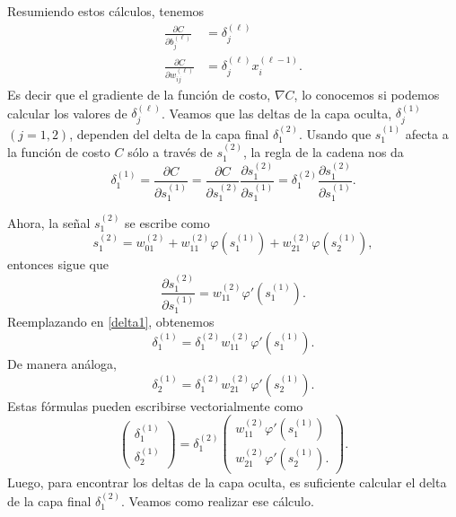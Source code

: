 \documentclass[12pt, a4paper]{amsbook}
\theoremstyle{remark}
\theoremstyle{definition}
\numberwithin{section}{chapter}
\numberwithin{subsection}{section}
\numberwithin{equation}{section}
\numberwithin{figure}{chapter}
\begin{document}
Resumiendo estos cálculos, tenemos
\begin{align}
\frac{\partial C}{\partial b_j^{(\ell)}} &= \delta_j^{(\ell)}\\
\frac{\partial C}{\partial w_{ij}^{(\ell)}} &= \delta_j^{(\ell)} x_i^{(\ell-1)}.
\end{align}
Es decir que el gradiente de la función de costo, $\nabla C$, lo conocemos si podemos calcular los valores de $\delta_j^{(\ell)}$. Veamos que las deltas de la capa oculta, $\delta_j^{(1)}$ $(j=1,2)$, dependen del delta de la capa final $\delta_1^{(2)}$. Usando que $s_1^{(1)}$ afecta a la función de costo $C$ sólo a través de $s_1^{(2)}$, la regla de la cadena nos da
\begin{equation}\label{delta1}
\delta_1^{(1)} = \frac{\partial C}{\partial s_1^{(1)}} =  \frac{\partial C}{\partial s_1^{(2)}} \frac{\partial s_1^{(2)}}{\partial s_1^{(1)}} = \delta_1^{(2)}\frac{\partial s_1^{(2)}}{\partial s_1^{(1)}}.
\end{equation}

Ahora, la señal $s_1^{(2)}$ se escribe como
$$
s_1^{(2)} = w_{01}^{(2)} + w_{11}^{(2)}\varphi(s_1^{(1)}) + w_{21}^{(2)}\varphi(s_2^{(1)}),
$$
entonces sigue que
$$
\frac{\partial s_1^{(2)}}{\partial s_1^{(1)}} =  w_{11}^{(2)}\varphi'(s_1^{(1)}).
$$
Reemplazando en \eqref{delta1}, obtenemos
$$
\delta_1^{(1)} = \delta_1^{(2)} w_{11}^{(2)}\varphi'(s_1^{(1)}).
$$
De manera análoga,
$$
\delta_2^{(1)} = \delta_1^{(2)} w_{21}^{(2)}\varphi'(s_2^{(1)}).
$$
Estas fórmulas pueden escribirse vectorialmente como
\begin{equation}\label{delta}
\begin{pmatrix}
\delta_1^{(1)} \\
\delta_2^{(1)}
\end{pmatrix} = \delta_1^{(2)} \begin{pmatrix}
w_{11}^{(2)}\varphi'(s_1^{(1)})\\
w_{21}^{(2)}\varphi'(s_2^{(1)}).
\end{pmatrix}.
\end{equation}
Luego, para encontrar los deltas de la capa oculta, es suficiente calcular el delta de la capa final $\delta_1^{(2)}$. Veamos como realizar ese cálculo.
\end{document}
